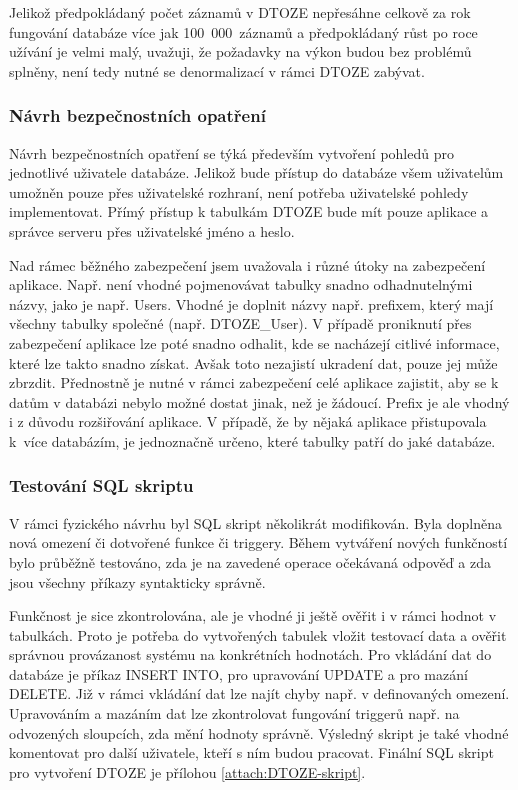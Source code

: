 \documentclass[11pt,a4paper]{article}
\begin{document}
Jelikož předpokládaný počet záznamů v DTOZE nepřesáhne celkově za rok fungování databáze více jak 100~000~záznamů a předpokládaný růst po roce užívání je velmi malý, uvažuji, že požadavky na výkon budou bez problémů splněny, není tedy nutné se denormalizací v rámci DTOZE zabývat.  

\subsubsection{Návrh bezpečnostních opatření \label{cap:bezpecnost}}
Návrh bezpečnostních opatření se týká především vytvoření pohledů pro jednotlivé uživatele databáze. Jelikož bude přístup do databáze všem uživatelům umožněn pouze přes uživatelské rozhraní, není potřeba uživatelské pohledy implementovat. Přímý přístup k tabulkám DTOZE bude mít pouze aplikace a správce serveru přes uživatelské jméno a heslo. 

Nad rámec běžného zabezpečení jsem uvažovala i různé útoky na zabezpečení aplikace. Např. není vhodné pojmenovávat tabulky snadno odhadnutelnými názvy, jako je např. Users. Vhodné je doplnit názvy např. prefixem, který mají všechny tabulky společné (např. DTOZE\_User). V případě proniknutí přes zabezpečení aplikace lze poté snadno odhalit, kde se nacházejí citlivé informace, které lze takto snadno získat. Avšak toto nezajistí ukradení dat, pouze jej může zbrzdit. Přednostně je nutné v rámci zabezpečení celé aplikace zajistit, aby se k datům v databázi nebylo možné dostat jinak, než je žádoucí. Prefix je ale vhodný i z důvodu rozšiřování aplikace. V případě, že by nějaká aplikace přistupovala k~více databázím, je jednoznačně určeno, které tabulky patří do jaké databáze.

\subsubsection{Testování SQL skriptu}
V rámci fyzického návrhu byl SQL skript několikrát modifikován. Byla doplněna nová omezení či dotvořené funkce či triggery. Během vytváření nových funkčností bylo průběžně testováno, zda je na zavedené operace očekávaná odpověď a zda jsou všechny příkazy syntakticky správně.  

Funkčnost je sice zkontrolována, ale je vhodné ji ještě ověřit i v rámci hodnot v tabulkách. Proto je potřeba do vytvořených tabulek vložit testovací data a ověřit správnou provázanost systému na konkrétních hodnotách. Pro vkládání dat do databáze je příkaz INSERT INTO, pro upravování UPDATE a pro mazání DELETE. Již v rámci vkládání dat lze najít chyby např. v definovaných omezení. Upravováním a mazáním dat lze zkontrolovat fungování triggerů např. na odvozených sloupcích, zda mění hodnoty správně. Výsledný skript je také vhodné komentovat pro další uživatele, kteří s ním budou pracovat. Finální SQL skript pro vytvoření DTOZE je přílohou \ref{attach:DTOZE-skript}.    
\end{document}
